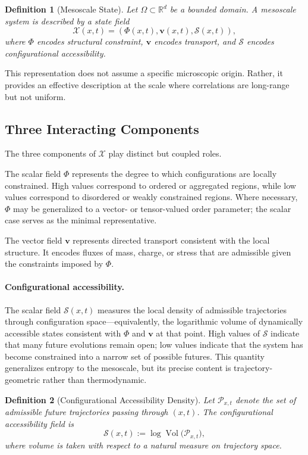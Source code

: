 \documentclass[11pt, a4paper, twocolumn]{article}
\newtheorem{definition}{Definition}[section]
\newcommand{\X}{\mathcal{X}}
\newcommand{\Sfield}{\mathcal{S}}
\begin{document}
\begin{definition}[Mesoscale State]
Let $\Omega \subset \mathbb{R}^d$ be a bounded domain. A mesoscale system is
described by a state field
\[
    \X(x,t) = (\Phi(x,t), \mathbf{v}(x,t), \Sfield(x,t)),
\]
where $\Phi$ encodes structural constraint, $\mathbf{v}$ encodes transport,
and $\Sfield$ encodes configurational accessibility.
\end{definition}

This representation does not assume a specific microscopic origin. Rather, it
provides an effective description at the scale where correlations are long-range
but not uniform.

\subsection{Three Interacting Components}

The three components of $\X$ play distinct but coupled roles.

The scalar field $\Phi$ represents the degree to which configurations are
locally constrained. High values correspond to ordered or aggregated regions,
while low values correspond to disordered or weakly constrained regions.
Where necessary, $\Phi$ may be generalized to a vector- or tensor-valued order
parameter; the scalar case serves as the minimal representative.

The vector field $\mathbf{v}$ represents directed transport consistent with
the local structure. It encodes fluxes of mass, charge, or stress that are
admissible given the constraints imposed by $\Phi$.

\paragraph{Configurational accessibility.}
The scalar field $\Sfield(x,t)$ measures the local density of admissible
trajectories through configuration space---equivalently, the logarithmic volume
of dynamically accessible states consistent with $\Phi$ and $\mathbf{v}$ at
that point. High values of $\Sfield$ indicate that many future evolutions remain
open; low values indicate that the system has become constrained into a narrow
set of possible futures. This quantity generalizes entropy to the mesoscale, but
its precise content is trajectory-geometric rather than thermodynamic.

\begin{definition}[Configurational Accessibility Density]
Let $\mathcal{P}_{x,t}$ denote the set of admissible future trajectories passing
through $(x,t)$. The configurational accessibility field is
\[
    \Sfield(x,t) := \log \operatorname{Vol}\bigl(\mathcal{P}_{x,t}\bigr),
\]
where volume is taken with respect to a natural measure on trajectory space.
\end{definition}
\end{document}
